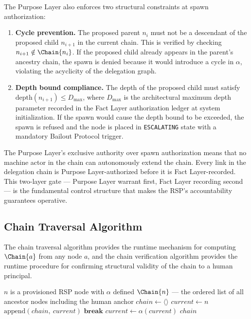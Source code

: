 The Purpose Layer also enforces two structural constraints at spawn authorization:

\begin{enumerate}
    \item[(C1)] \textbf{Cycle prevention.} The proposed parent $n_i$ must not be a descendant of the proposed child $n_{i+1}$ in the current chain. This is verified by checking $n_{i+1} \notin \Chain{n_i}$. If the proposed child already appears in the parent's ancestry chain, the spawn is denied because it would introduce a cycle in $\alpha$, violating the acyclicity of the delegation graph.
    \item[(C2)] \textbf{Depth bound compliance.} The depth of the proposed child must satisfy $\mathrm{depth}(n_{i+1}) \leq D_{\max}$, where $D_{\max}$ is the architectural maximum depth parameter recorded in the Fact Layer authorization ledger at system initialization. If the spawn would cause the depth bound to be exceeded, the spawn is refused and the node is placed in \texttt{ESCALATING} state with a mandatory Bailout Protocol trigger.
\end{enumerate}

The Purpose Layer's exclusive authority over spawn authorization means that no machine actor in the chain can autonomously extend the chain. Every link in the delegation chain is Purpose Layer-authorized before it is Fact Layer-recorded. This two-layer gate --- Purpose Layer warrant first, Fact Layer recording second --- is the fundamental control structure that makes the RSP's accountability guarantees operative.

\subsection{Chain Traversal Algorithm}
\label{sec:chain-traversal}

The chain traversal algorithm provides the runtime mechanism for computing $\Chain{a}$ from any node $a$, and the chain verification algorithm provides the runtime procedure for confirming structural validity of the chain to a human principal.

\begin{algorithm}
\caption{Chain-Traverse($n$) --- Build the delegation chain from node $n$ to the human anchor}
\label{alg:chain-traverse}
\begin{algorithmic}[1]
\REQUIRE $n$ is a provisioned RSP node with $\alpha$ defined
\ENSURE $\Chain{n}$ --- the ordered list of all ancestor nodes including the human anchor
\STATE $chain \leftarrow \langle \rangle$ 
\STATE $current \leftarrow n$ 
    \STATE $\mathrm{append}(chain,\ current)$ 
        \STATE $\textbf{break}$ 
    \ENDIF
    \STATE $current \leftarrow \alpha(current)$ 
\ENDWHILE
\RETURN $chain$
\end{algorithmic}
\end{algorithm}


